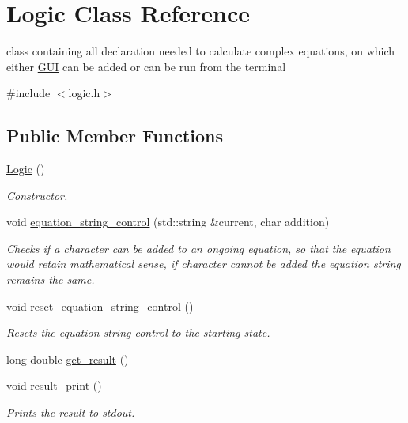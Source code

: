 \hypertarget{class_logic}{}\section{Logic Class Reference}
\label{class_logic}


class containing all declaration needed to calculate complex equations, on which either \mbox{\hyperlink{class_g_u_i}{G\+UI}} can be added or can be run from the terminal  




{\ttfamily \#include $<$logic.\+h$>$}

\subsection*{Public Member Functions}
\begin{DoxyCompactItemize}
\item 
\mbox{\hyperlink{class_logic_a65e13b69a0b4ae0c31be94bcfe11898a}{Logic}} ()
\begin{DoxyCompactList}\small\item\em Constructor. \end{DoxyCompactList}\item 
void \mbox{\hyperlink{class_logic_a69ca39fc8e7df2d81f50d6d10b38677b}{equation\+\_\+string\+\_\+control}} (std\+::string \&current, char addition)
\begin{DoxyCompactList}\small\item\em Checks if a character can be added to an ongoing equation, so that the equation would retain mathematical sense, if character cannot be added the equation string remains the same. \end{DoxyCompactList}\item 
void \mbox{\hyperlink{class_logic_aa2cf521dfcbfd80d476ebb91a95a7eca}{reset\+\_\+equation\+\_\+string\+\_\+control}} ()
\begin{DoxyCompactList}\small\item\em Resets the equation string control to the starting state. \end{DoxyCompactList}\item 
long double \mbox{\hyperlink{class_logic_aa5558988a60bada489bb0ddfae4466b4}{get\+\_\+result}} ()
\item 
void \mbox{\hyperlink{class_logic_a014ef0be6c84ba01f492c8f789409cd3}{result\+\_\+print}} ()
\begin{DoxyCompactList}\small\item\em Prints the result to stdout. \end{DoxyCompactList}\item 

\end{DoxyCompactItemize}
